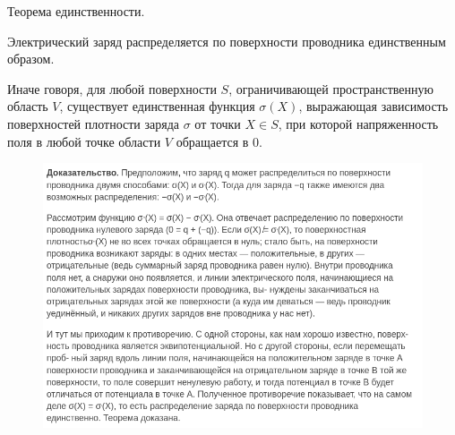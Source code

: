 \begin{theorem}
    Теорема единственности.

    Электрический заряд распределяется по поверхности проводника единственным образом.

    Иначе говоря, для любой поверхности $S$, ограничивающей пространственную область $V$, существует единственная функция $\sigma(X)$, 
    выражающая зависимость поверхностей плотности заряда $\sigma$ от точки  $X\in S$, при которой напряженность поля в любой точке 
    области $V$ обращается в 0.
\end{theorem}
\begin{figure}[h]
    \centering
    \includegraphics[width=0.7\linewidth]{imgs/q25i1.png}
\end{figure}